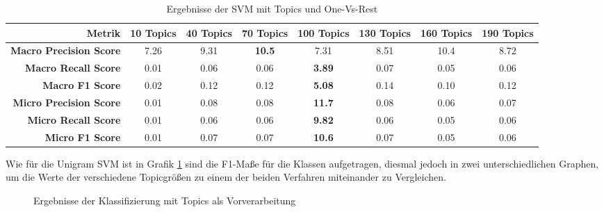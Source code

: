 \begin{table}[h]
    \begin{tabular}{r|ccccccc}
        \tiny\textbf{Metrik} & \tiny\textbf{10 Topics} &\tiny \textbf{40 Topics} &\tiny \textbf{70 Topics} &\tiny \textbf{100 Topics} & \tiny \textbf{130 Topics} &  \tiny \textbf{160 Topics} &  \tiny \textbf{190 Topics} \\
        \hline
        \tiny \textbf{Macro Precision Score}  & \tiny 7.26& \tiny 9.31& \tiny \textbf{10.5}&\tiny 7.31&\tiny 8.51&\tiny 10.4&\tiny 8.72\\
        \tiny \textbf{Macro Recall Score}     & \tiny 0.01& \tiny 0.06& \tiny 0.06&\tiny \textbf{3.89}&\tiny 0.07&\tiny 0.05&\tiny 0.06\\
        \tiny \textbf{Macro F1 Score}        & \tiny 0.02& \tiny 0.12& \tiny 0.12&\tiny \textbf{5.08}&\tiny 0.14&\tiny 0.10&\tiny 0.12\\
        \tiny \textbf{Micro Precision Score} & \tiny 0.01& \tiny 0.08& \tiny 0.08&\tiny \textbf{11.7}&\tiny 0.08&\tiny 0.06&\tiny 0.07\\
        \tiny \textbf{Micro Recall Score}    & \tiny 0.01& \tiny 0.06& \tiny 0.06&\tiny \textbf{9.82}&\tiny 0.06&\tiny 0.05&\tiny 0.06\\
        \tiny \textbf{Micro F1 Score}        & \tiny 0.01& \tiny 0.07& \tiny 0.07&\tiny \textbf{10.6}&\tiny 0.07&\tiny 0.05&\tiny 0.06\\
    \end{tabular}
    \caption{Ergebnisse der SVM mit Topics und One-Vs-Rest}
    \label{tab:topics_svm_ovr}
\end{table}

Wie für die Unigram SVM ist in Grafik \ref{fig:svm_topic_eval} sind die F1-Maße für die Klassen aufgetragen,
diesmal jedoch in zwei unterschiedlichen Graphen, um die Werte der verschiedene Topicgrößen zu einem der beiden Verfahren miteinander
zu Vergleichen.

\begin{figure}[H]
    \centering
    \def\svgwitdth{0.1\columnwidth}
    
    \caption{Ergebnisse der Klassifizierung mit Topics als Vorverarbeitung}
    \label{fig:svm_topic_eval}
\end{figure}
